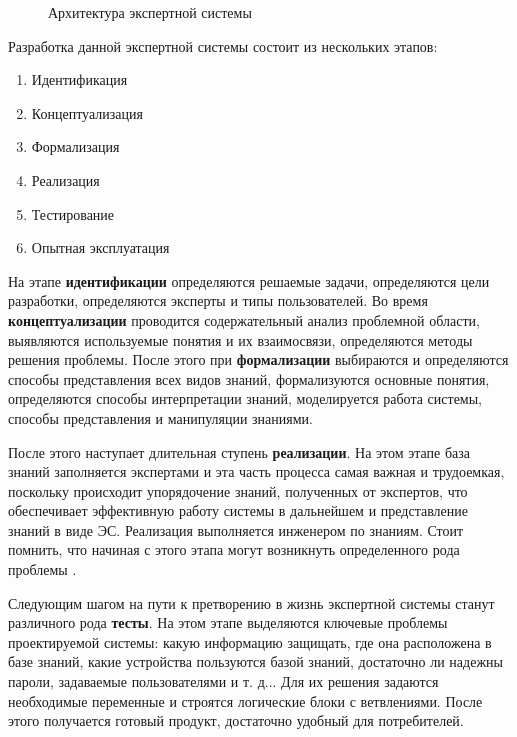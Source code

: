 \begin{figure}[h]
    \caption{Архитектура экспертной системы \cite{idea}}
    \label{arch}
\end{figure}

Разработка данной экспертной системы состоит из нескольких этапов:
\begin{enumerate}
    \item
    Идентификация
    \item
    Концептуализация
    \item
    Формализация
    \item
    Реализация
    \item
    Тестирование
    \item
    Опытная эксплуатация
\end{enumerate}

На этапе \textbf{идентификации} определяются решаемые задачи, определяются цели разработки,
определяются эксперты и типы пользователей. Во время \textbf{концептуализации} проводится
содержательный анализ проблемной области, выявляются используемые понятия и их взаимосвязи,
определяются методы решения проблемы. После этого при \textbf{формализации}
выбираются и определяются способы представления всех видов знаний, формализуются основные
понятия, определяются способы интерпретации знаний, моделируется работа системы, способы
представления и манипуляции знаниями.

После этого наступает длительная ступень \textbf{реализации}. На этом этапе база знаний
заполняется экспертами и эта часть процесса самая важная и трудоемкая, поскольку происходит
упорядочение знаний, полученных от экспертов, что обеспечивает эффективную работу системы
в дальнейшем и представление знаний в виде ЭС. Реализация выполняется инженером по знаниям.
Стоит помнить, что начиная с этого этапа могут возникнуть определенного рода проблемы \cite{idea}.

Следующим шагом на пути к претворению в жизнь экспертной системы станут различного рода \textbf{тесты}.
На этом этапе выделяются ключевые проблемы проектируемой системы: какую информацию защищать, где она
расположена в базе знаний, какие устройства пользуются базой знаний, достаточно ли надежны пароли,
задаваемые пользователями и т. д... Для их решения задаются необходимые переменные и строятся логические
блоки с ветвлениями. После этого получается готовый продукт, достаточно удобный для потребителей.


